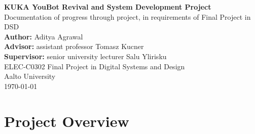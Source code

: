 \documentclass[a4paper, 12pt]{article}
\newcommand{\projectTitle}{KUKA YouBot Revival and System Development Project}
\newcommand{\projectSubtitle}{Documentation of progress through project, in requirements of Final Project in DSD}
\newcommand{\authorName}{Aditya Agrawal}
\newcommand{\advisorName}{assistant professor Tomasz Kucner}
\newcommand{\supervisorName}{senior university lecturer Salu Ylirisku}
\newcommand{\courseName}{ELEC-C0302 Final Project in Digital Systems and Design}
\newcommand{\universityName}{Aalto University}
\newcommand{\commentout}[1]{}
\begin{document}
    \begin{titlepage}
        \raggedright
        

        \vspace*{2cm}

        {\Huge \textbf{\projectTitle}}\\[0.5cm]
        {\Large \projectSubtitle}\\[2cm]

        \textbf{Author:} \authorName\\[0.3cm]
        \textbf{Advisor:} \advisorName\\[0.3cm]
        \textbf{Supervisor:} \supervisorName\\[2cm]

        \courseName \\
        \universityName\\[0.5cm]
        \today

        \vfill
    \end{titlepage}
    \romantableofcontents

    \commentout{\section{Ideas \& Drafts (NOT ON FINAL REPORT)}
    structure: 
    My work
    reflection
    appendix: user manual

    things I did i want to add:
    - add in the initial project plan
    - add in the initial state of everything
    - known documentation

    - libfreenect and kinect camera
    - communication with onboard computer
    - enabling it to initially move through provided demos
    - utilising ROS1-ROS2 bridge (fail)
    - fixing the battery up 
    - writing my own programs to move the bot 
    
    - how did my goals change with time?
    - project management brief overview
    Teach and repeat background:
    https://furgalep.github.io/bib/mcmanus_icra12.pdf
    https://www.sciencedirect.com/science/article/pii/S0921889020304176
    https://arxiv.org/pdf/2309.15405
    https://clearpathrobotics.com/blog/2018/07/visual-teach-and-repeat-closer-look-part-1/}

    
    
    \section{Project Overview}
\end{document}
